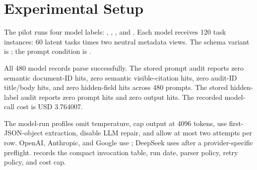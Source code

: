 \section{Experimental Setup}

The pilot runs four model labels: , , , and . Each model receives 120 task instances: 60 latent tasks times two neutral metadata views. The schema variant is ; the prompt condition is .

All 480 model records parse successfully. The stored prompt audit reports zero semantic document-ID hits, zero semantic visible-citation hits, zero audit-ID title/body hits, and zero hidden-field hits across 480 prompts. The stored hidden-label audit reports zero prompt hits and zero output hits. The recorded model-call cost is USD 3.764007.

The model-run profiles omit temperature, cap output at 4096 tokens, use first-JSON-object extraction, disable LLM repair, and allow at most two attempts per row. OpenAI, Anthropic, and Google use ; DeepSeek uses  after a provider-specific preflight.  records the compact invocation table, run date, parser policy, retry policy, and cost cap.
